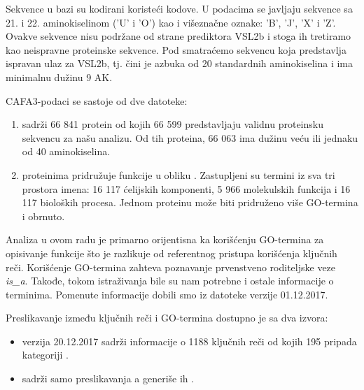 
Sekvence u bazi \swissprot su kodirani koristeći  kodove.  U
podacima se javljaju sekvence sa  21. i 22. aminokiselinom ('U' i 'O') kao i
višeznačne oznake: 'B', 'J', 'X' i 'Z'.  Ovakve sekvence nisu podržane od
strane prediktora VSL2b i stoga ih tretiramo kao neispravne proteinske
sekvence. Pod  smatraćemo sekvencu koja
predstavlja ispravan ulaz za VSL2b, tj. čini je azbuka od 20 standardnih
aminokiselina i ima minimalnu dužinu 9 AK.

CAFA3-podaci se sastoje od dve datoteke:
\begin{enumerate}
  \item {}  sadrži 66 841 protein od kojih 66 599
    predstavljaju validnu proteinsku sekvencu za našu analizu. Od tih
    proteina, 66 063 ima dužinu veću ili jednaku od 40 aminokiselina.
  \item {} proteinima pridružuje funkcije u obliku 
    . Zastupljeni su termini iz sva tri prostora imena:
    16 117 ćelijskih komponenti, 5 966 molekulskih funkcija i 16 117 bioloških
    procesa. Jednom proteinu može biti pridruženo više GO-termina i obrnuto.
\end{enumerate}

Analiza u ovom radu je primarno orijentisna ka korišćenju GO-termina za opisivanje
funkcije što je razlikuje od referentnog pristupa korišćenja ključnih reči.
Korišćenje GO-termina zahteva poznavanje prvenstveno  roditeljske veze
\textit{is\_a}.  Takođe, tokom istraživanja bile su nam potrebne
i ostale informacije o terminima. Pomenute informacije dobili smo iz datoteke
 \cite{go_obo} verzije 01.12.2017.

Preslikavanje između ključnih reči i GO-termina dostupno je sa dva izvora:
\begin{itemize}
  \item {}\cite{keywlist_txt} verzija 20.12.2017 sadrži
    informacije o 1188 ključnih reči od kojih 195 pripada kategoriji
    .
  \item {}\cite{uniprotkb_kw2go} sadrži samo preslikavanja a
    generiše ih  \parencite{Barrell2009}. 
\end{itemize}

